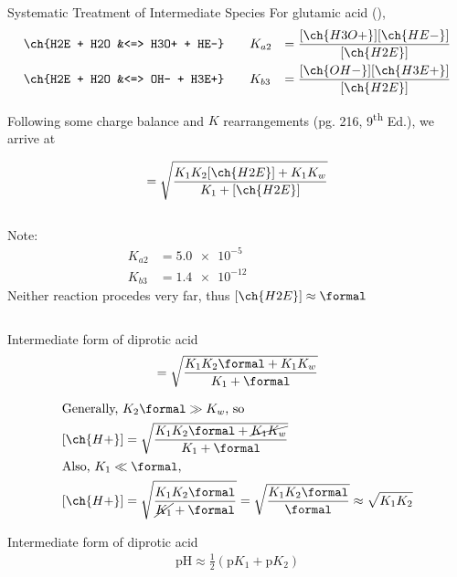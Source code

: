 \documentclass[notes=show]{beamer}
\begin{document}
\begin{frame}[allowframebreaks]{Systematic Treatment of Intermediate Species}
	For glutamic acid (),
	\begin{align*}
		\ch{H2E + H2O &<=> H3O+ + HE-} &\qquad K_{a2} &=
		\frac{[\ch{H3O+}][\ch{HE-}]}{[\ch{H2E}]} \\
		\ch{H2E + H2O &<=> OH- + H3E+} &\qquad K_{b3} &=
		\frac{[\ch{OH-}][\ch{H3E+}]}{[\ch{H2E}]}
	\end{align*}

	Following some charge balance and $K$ rearrangements (pg. 216,
	9\textsuperscript{th} Ed.), we arrive at

	\begin{align*}
		[\ch{H+}] = \sqrt{\frac{K_1K_2[\ch{H2E}] + K_1K_w}{K_1 +
		[\ch{H2E}]}}
	\end{align*}

	\framebreak

	\begin{columns}
		Note:
		\begin{align*}
			K_{a2} &= \num{5.0e-5} \\
			K_{b3} &= \num{1.4e-12}
		\end{align*}
		\alert{Neither reaction procedes very far, thus
		$[\ch{H2E}] \approx \si{\formal}$}
	\end{columns}

	\bigskip

	\begin{block}{Intermediate form of diprotic acid}
		\begin{align*}
			[\ch{H+}] = \sqrt{\frac{K_1K_2\si{\formal} + K_1K_w}{K_1
			+ \si{\formal}}}
		\end{align*}
	\end{block}

	\framebreak

	\begin{align*}
		\intertext{Generally, $K_2\si{\formal} \gg K_w$, so}
		[\ch{H+}] &= \sqrt{\frac{K_1K_2\si{\formal} +
		\cancel{K_1K_w}}{K_1 + \si{\formal}}} \\
		\intertext{Also, $K_1 \ll \si{\formal}$,}
		[\ch{H+}] &= \sqrt{\frac{K_1K_2\si{\formal}}{\cancel{K_1} +
		\si{\formal}}} = \sqrt{\frac{K_1K_2\si{\formal}}{\si{\formal}}}
		\approx \sqrt{K_1K_2} \\
	\end{align*}

	\begin{block}{Intermediate form of diprotic acid}
		\begin{align*}
			\text{pH} \approx \frac{1}{2}(\text{p}K_1 + \text{p}K_2)
		\end{align*}
	\end{block}
\end{frame}
\end{document}
